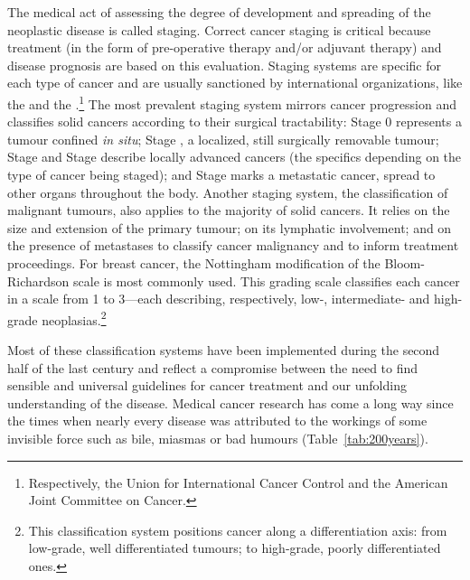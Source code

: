 The medical act of assessing the degree of development and spreading of the
neoplastic disease is called staging.  Correct cancer staging is critical
because treatment (in the form of pre-operative therapy and/or adjuvant therapy)
and disease prognosis are based on this evaluation.  Staging systems are
specific for each type of cancer and are usually sanctioned by international
organizations, like the  and the
.\footnote{Respectively, the Union for International Cancer
  Control and the American Joint Committee on Cancer.}  The most prevalent
staging system mirrors cancer progression and classifies solid cancers according
to their surgical tractability: Stage 0 represents a tumour confined \emph{in
  situ}; Stage , a localized, still surgically removable tumour;
Stage  and Stage  describe locally advanced cancers
(the specifics depending on the type of cancer being staged); and Stage
 marks a metastatic cancer, spread to other organs throughout the
body.\cite{greene_ajcc_2002} Another staging system, the 
classification of malignant tumours, also applies to the majority of solid
cancers. It relies on the size and extension of the primary tumour; on its
lymphatic involvement; and on the presence of metastases to classify cancer
malignancy and to inform treatment proceedings.\cite{denoix_enquete_1946} For
breast cancer, the Nottingham modification of the Bloom-Richardson scale is most
commonly used. This grading scale classifies each cancer in a scale from 1 to
3---each describing, respectively, low-, intermediate- and high-grade
neoplasias.\footnote{This classification system positions cancer along a
  differentiation axis: from low-grade, well differentiated tumours; to
  high-grade, poorly differentiated ones.}

Most of these classification systems have been implemented during the second
half of the last century and reflect a compromise between the need to find
sensible and universal guidelines for cancer treatment and our unfolding
understanding of the disease.  Medical cancer research has come a long way since
the times when nearly every disease was attributed to the workings of some
invisible force such as bile, miasmas or bad humours (Table~\ref{tab:200years}).

